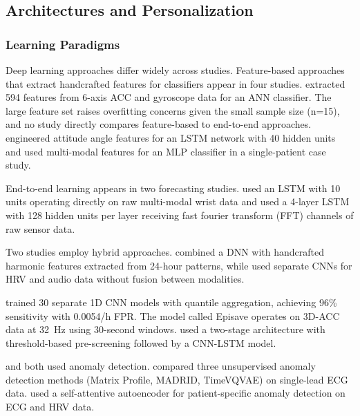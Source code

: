 \subsection{Architectures and Personalization}
\label{sec:architecture-patterns}

\subsubsection{Learning Paradigms}

Deep learning approaches differ widely across studies. Feature-based approaches that extract handcrafted features for classifiers appear in four studies. \textcite{fineDetectionKeyAutomated2025} extracted 594 features from 6-axis ACC and gyroscope data for an ANN classifier. The large feature set raises overfitting concerns given the small sample size (n=15), and no study directly compares feature-based to end-to-end approaches. \textcite{wangEpilepticSeizureDetection2025} engineered attitude angle features for an LSTM network with 40 hidden units and \textcite{singhrathoreDevelopmentMultimodalMachine2024} used multi-modal features for an MLP classifier in a single-patient case study.

End-to-end learning appears in two forecasting studies. \textcite{meiselMachineLearningWristband2020} used an LSTM with 10 units operating directly on raw multi-modal wrist data  and \textcite{nasseriAmbulatorySeizureForecasting2021} used a 4-layer LSTM with 128 hidden units per layer receiving fast fourier transform (FFT) channels of raw sensor data.

Two studies employ hybrid approaches. \textcite{vielufSeizureMonitoringCombined2025} combined a DNN with handcrafted harmonic features extracted from 24-hour patterns, while \textcite{elemamAutomatedValidatedTool2025} used separate CNNs for HRV and audio data without fusion between modalities.

\textcite{spahrDeepLearningbasedDetection2025} trained 30 separate 1D CNN models with quantile aggregation, achieving 96\% sensitivity with 0.0054/h FPR. The model called Episave operates on 3D-ACC data at 32~Hz using 30-second windows. \textcite{dongTwoLayerEnsembleMethod2022} used a two-stage architecture with threshold-based pre-screening followed by a CNN-LSTM model.

\textcite{reintjesECGBasedDetectionEpileptic2025} and \textcite{odeDevelopmentEpilepticSeizure2023} both used anomaly detection. \textcite{reintjesECGBasedDetectionEpileptic2025} compared three unsupervised anomaly detection methods (Matrix Profile, MADRID, TimeVQVAE) on single-lead ECG data. \textcite{odeDevelopmentEpilepticSeizure2023} used a self-attentive autoencoder for patient-specific anomaly detection on ECG and HRV data.

